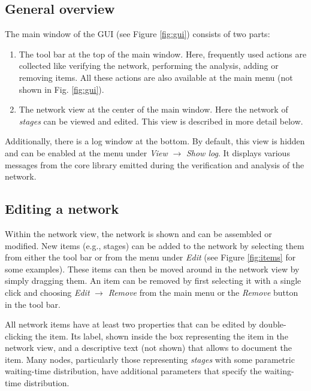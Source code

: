\subsection{General overview}
The main window of the GUI (see Figure \ref{fig:gui}) consists of two parts:
\begin{enumerate}
 \item The tool bar at the top of the main window. Here, frequently used actions are collected like verifying the network, performing the analysis,
 adding or removing items. All these actions are also available at the main menu (not shown in Fig. \ref{fig:gui}).
 \item The network view at the center of the main window. Here the network of \emph{stages} can be viewed and edited. This view is described in more detail below.
\end{enumerate}

Additionally, there  is a log window at the bottom. By default, this view is hidden and can be enabled at the menu under \emph{View} $\rightarrow$ \emph{Show log}. It displays various messages from the core library emitted during the verification and analysis of the network. 


\subsection{Editing a network}
Within the network view, the network is shown and can be assembled or modified. New items (e.g., stages) can be added to the network by selecting them from either the tool bar or from the menu under \emph{Edit} (see Figure \ref{fig:items} for some examples). These items can then be moved around in the network view by simply dragging them. An item can be removed by first selecting it with a single click and choosing \emph{Edit} $\rightarrow$ \emph{Remove} from the main menu or the \emph{Remove} button in the tool bar.

All network items have at least two properties that can be edited by double-clicking the item. Its label, shown inside the box representing the item in the network view, and a descriptive text (not shown) that allows to document the item. Many nodes, particularly those representing \emph{stages} with some parametric waiting-time distribution, have additional parameters that specify the waiting-time distribution. 

